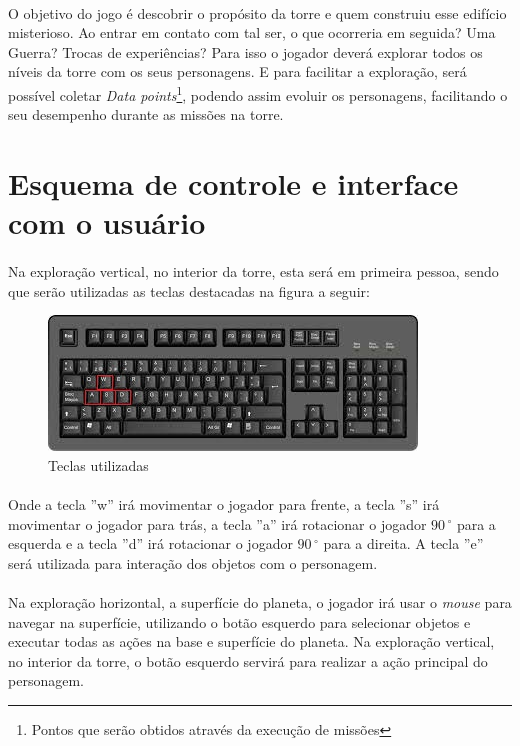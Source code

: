 \documentclass[11pt]{article} %
\begin{document}
\paragraph{}O objetivo do jogo é descobrir o propósito da torre e quem construiu esse edifício misterioso. Ao entrar em contato com tal ser, o que ocorreria em seguida? Uma Guerra? Trocas de experiências? Para isso o jogador deverá explorar todos os níveis da torre com os seus personagens. E para facilitar a exploração, será possível coletar \textit{Data points}\footnote{Pontos que serão obtidos através da execução de missões}, podendo assim evoluir os personagens, facilitando o seu desempenho durante as missões na torre. 

\section{Esquema de controle e interface com o usuário}

\paragraph{}Na exploração vertical, no interior da torre, esta será em primeira pessoa, sendo que serão utilizadas as teclas destacadas na figura a seguir:\\

\begin{figure}[!htp]
\centering
\includegraphics[scale=0.75]{res/keyboard.jpg}
\caption{Teclas utilizadas}
\label{Teclado}
\end{figure}

\paragraph{}Onde a tecla ''w'' irá movimentar o jogador para frente, a tecla ''s'' irá movimentar o jogador para trás, a tecla ''a'' irá rotacionar o jogador $90\,^{\circ}$ para a esquerda e a tecla ''d'' irá rotacionar o jogador $90\,^{\circ}$ para a direita. A tecla ''e'' será utilizada para interação dos objetos com o personagem.

\paragraph{}Na exploração horizontal, a superfície do planeta, o jogador irá usar o \textit{mouse} para navegar na superfície, utilizando o botão esquerdo para selecionar objetos e executar todas as ações na base e superfície do planeta. Na exploração vertical, no interior da torre, o botão esquerdo servirá para realizar a ação principal do personagem.
\end{document}

